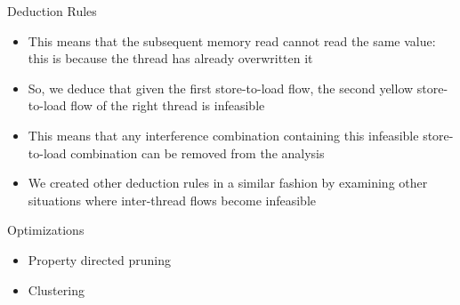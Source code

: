 \documentclass[t]{beamer}
\begin{document}
\begin{frame}{Deduction Rules}
{\begin{itemize}
      \item This means that the subsequent memory read cannot read the same
        value: this is because the thread has already overwritten it
      \item So, we deduce that given the first store-to-load flow, the second
        yellow store-to-load flow of the right thread is infeasible
      \item This means that any interference combination containing this
        infeasible store-to-load combination can be removed from the analysis
      \item We created other deduction rules in a similar fashion by examining
        other situations where inter-thread flows become infeasible
    \end{itemize}
  }
\end{frame}


\begin{frame}{Optimizations}
  \begin{itemize}[<+->]
    \item Property directed pruning
    \item Clustering
  \end{itemize}
\end{frame}
\end{document}
